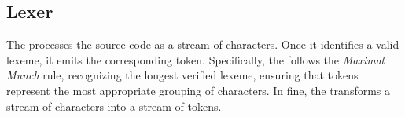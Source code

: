 \subsection{Lexer}

The \lexer{} processes the source code as a stream of characters. Once it identifies
a valid lexeme, it emits the corresponding token. Specifically, the \lexer{} follows
the \textit{Maximal Munch} rule, recognizing the longest verified lexeme, ensuring
that tokens represent the most appropriate grouping of characters. In fine, the
\lexer{} transforms a stream of characters into a stream of tokens.

